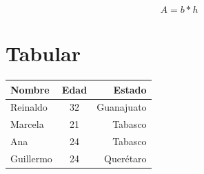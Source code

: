 \documentclass[twocolumn]{article}
\begin{document}
\begin{equation}\label{eq:Area}
A=b*h
\end{equation}


\section{Tabular} %
\label{sec:tabular}

\begin{center}
	
\begin{tabular}{|||l|c|r|||}
 \hline
 \hline
 \textbf{Nombre} & \textbf{Edad} & \textbf{Estado}\\
 \hline
 \hline
 \hline 
 Reinaldo	&	32	&	Guanajuato\\
 Marcela	&	21	&	Tabasco\\
 Ana 		&	24	&	Tabasco\\
 Guillermo	&	24	&	Quer\'etaro\\
 \hline
 \hline
\end{tabular}

\end{center}
\end{document}
